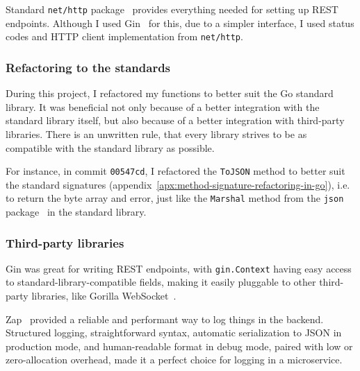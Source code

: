 Standard \texttt{net/http} package~\cite{cox_http_2022} provides everything
needed for setting up \ac{REST} endpoints.
Although I used Gin~\cite{martinez-almeida_gin_2022} for this,
due to a simpler interface,
I used status codes
and \ac{HTTP} client implementation
from \texttt{net/http}.

\subsubsection{Refactoring to the standards}\label{sec:refactoring-to-the-standards}

During this project,
I refactored my functions to better suit
the Go standard library.
It was beneficial
not only because of a better integration
with the standard library itself,
but also because of a better integration
with third-party libraries.
There is an unwritten rule,
that every library strives
to be as compatible
with the standard library as possible.

For instance,
in commit \texttt{00547cd},
I refactored the \texttt{ToJSON} method
to better suit the standard signatures
(appendix~\ref{apx:method-signature-refactoring-in-go}),
i.e. to return the byte array and error,
just like the \texttt{Marshal} method
from the \texttt{json} package~\cite{cox_json_2022}
in the standard library.

\subsubsection{Third-party libraries}\label{sec:third-party-libraries}

Gin was great for writing \ac{REST} endpoints,
with \texttt{gin.Context} having easy access to
standard-library-compatible fields,
making it easily pluggable to other third-party libraries,
like Gorilla WebSocket~\cite{burd_gorilla_2022}.

Zap~\cite{shah_zap_2022} provided a reliable
and performant way to log things in the backend.
Structured logging,
straightforward syntax,
automatic serialization to \ac{JSON} in production mode,
and human-readable format in debug mode,
paired with low or zero-allocation overhead,
made it a perfect choice for logging in a microservice.

